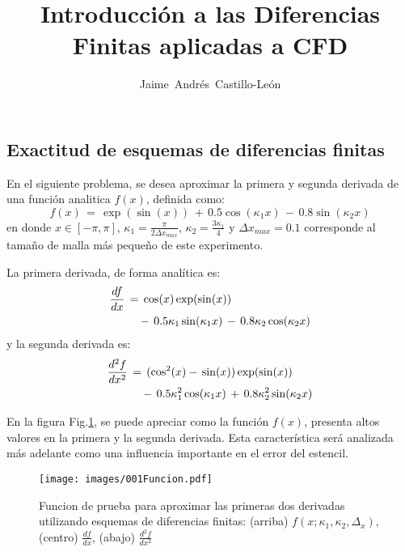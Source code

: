 \documentclass[9pt,technote,twoside,letterpaper,onecolumn]{IEEEtran}
\title{Introducción a las Diferencias Finitas aplicadas a CFD}
\author{Jaime~Andrés~Castillo-León}
\begin{document}
\begin{multicols}{2}
\maketitle



\section{Exactitud de esquemas de diferencias finitas}
\label{sec:exac}
En el siguiente problema, se desea aproximar la primera y segunda derivada de una función analitica $f(x)$,  definida como:
\begin{equation}
  f(x)\,=\,\exp(\sin(x))\,+\,0.5\cos(\kappa_1x)\,-\,0.8\sin(\kappa_2x)
  \label{eq:fun}
\end{equation}
en donde $x\in[-\pi,\pi]$, $\kappa_1 = \frac{\pi}{2\Delta x_{max}}$, $\kappa_2 = \frac{3\kappa_1}{4}$ y $\Delta x_{max}=0.1$ corresponde al tamaño de malla más pequeño de este experimento.

La primera derivada, de forma analítica es:
\begin{align}
  \frac{df}{dx}\,&=\,\cos(x)\exp(\sin(x))\notag\\
&\quad-\,0.5\kappa_1\sin(\kappa_1x)\,-\,0.8\kappa_2\cos(\kappa_2x)
  \label{eq:dfun}
\end{align}
y la segunda derivada es:
\begin{align}
  \frac{d^2f}{dx^2}\,&=\,(\cos^2(x)-\,\sin(x))\exp(\sin(x))\notag\\
&\quad-\,0.5\kappa^2_1\cos(\kappa_1x)\,+\,0.8\kappa^2_2\sin(\kappa_2x)
  \label{eq:d2fun}
\end{align}

En la figura Fig.\ref{fig:funx}, se puede apreciar como la función $f(x)$, presenta altos valores en la primera y la segunda derivada. Esta característica será analizada más adelante como una influencia importante en el error del estencil.
\begin{figure}[H]
  \centering
  \texttt{[image: images/001Funcion.pdf]}\\
  \label{fig:funx}
  \caption{Funcion de prueba para aproximar las primeras dos derivadas utilizando esquemas de diferencias finitas: (arriba) $f(x;\kappa_1,\kappa_2,\Delta_x)$, (centro) $\frac{df}{dx}$, (abajo) $\frac{d^2f}{dx^2}$}
\end{figure}


\end{multicols}
\end{document}
